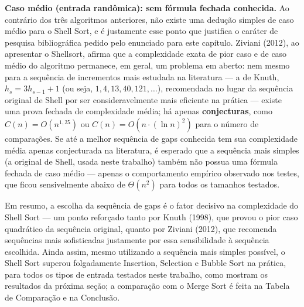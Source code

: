 \textbf{Caso médio (entrada randômica): sem fórmula fechada
conhecida.} Ao contrário dos três algoritmos anteriores, não existe
uma dedução simples de caso médio para o Shell Sort, e é justamente
esse ponto que justifica o caráter de pesquisa bibliográfica pedido
pelo enunciado para este capítulo. Ziviani (2012), ao apresentar o
Shellsort, afirma que a complexidade exata de pior caso e de caso
médio do algoritmo permanece, em geral, um problema em aberto: nem
mesmo para a sequência de incrementos mais estudada na literatura —
a de Knuth, $h_s = 3h_{s-1}+1$ (ou seja, $1, 4, 13, 40, 121, \ldots$),
recomendada no lugar da sequência original de Shell por ser
consideravelmente mais eficiente na prática — existe uma prova
fechada de complexidade média; há apenas \textbf{conjecturas}, como
$C(n) = O(n^{1,25})$ ou $C(n) = O(n \cdot (\ln n)^2)$ para o número de
comparações. Se até a melhor sequência de gaps conhecida tem sua
complexidade média apenas conjecturada na literatura, é esperado que
a sequência mais simples (a original de Shell, usada neste trabalho)
também não possua uma fórmula fechada de caso médio — apenas o
comportamento empírico observado nos testes, que ficou sensivelmente
abaixo de $\Theta(n^2)$ para todos os tamanhos testados.

\qquad Em resumo, a escolha da sequência de gaps é o fator decisivo na
complexidade do Shell Sort — um ponto reforçado tanto por Knuth
(1998), que provou o pior caso quadrático da sequência original, quanto
por Ziviani (2012), que recomenda sequências mais sofisticadas
justamente por essa sensibilidade à sequência escolhida. Ainda assim,
mesmo utilizando a sequência mais simples possível, o Shell Sort
superou folgadamente Insertion, Selection e Bubble Sort na prática,
para todos os tipos de entrada testados neste trabalho, como mostram os resultados da próxima seção; a comparação com o Merge Sort é feita na Tabela de Comparação e na Conclusão.
